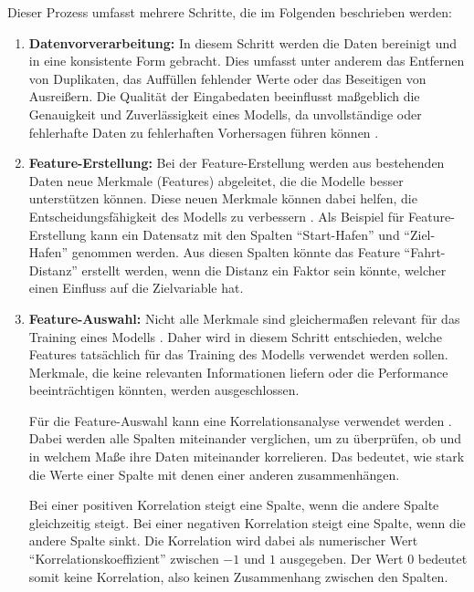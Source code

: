 Dieser Prozess umfasst mehrere Schritte, die im Folgenden beschrieben werden:

\begin{enumerate}
    \item \textbf{Datenvorverarbeitung:}  
    In diesem Schritt werden die Daten bereinigt und in eine konsistente Form gebracht. Dies umfasst unter anderem das Entfernen von Duplikaten, das Auffüllen fehlender Werte oder das Beseitigen von Ausreißern. Die Qualität der Eingabedaten beeinflusst maßgeblich die Genauigkeit und Zuverlässigkeit eines Modells, da unvollständige oder fehlerhafte Daten zu fehlerhaften Vorhersagen führen können \cite{Goodfellow2016}. 

    \item \textbf{Feature-Erstellung:}  
    Bei der Feature-Erstellung werden aus bestehenden Daten neue Merkmale (Features) abgeleitet, die die Modelle besser unterstützen können. Diese neuen Merkmale können dabei helfen, die Entscheidungsfähigkeit des Modells zu verbessern \cite{Hastie2009}. 
    Als Beispiel für Feature-Erstellung kann ein Datensatz mit den Spalten \enquote{Start-Hafen} und \enquote{Ziel-Hafen} genommen werden. Aus diesen Spalten könnte das Feature \enquote{Fahrt-Distanz} erstellt werden, wenn die Distanz ein Faktor sein könnte, welcher einen Einfluss auf die Zielvariable hat.

    
    \item \textbf{Feature-Auswahl:}  
    Nicht alle Merkmale sind gleichermaßen relevant für das Training eines Modells \cite{Goodfellow2016}. Daher wird in diesem Schritt entschieden, welche Features tatsächlich für das Training des Modells verwendet werden sollen. Merkmale, die keine relevanten Informationen liefern oder die Performance beeinträchtigen könnten, werden ausgeschlossen. 

    Für die Feature-Auswahl kann eine Korrelationsanalyse verwendet werden \cite{Guyon2003}. 
    Dabei werden alle Spalten miteinander verglichen, um zu überprüfen, ob und in welchem Maße ihre Daten miteinander korrelieren.   
    Das bedeutet, wie stark die Werte einer Spalte mit denen einer anderen zusammenhängen. 
    
    Bei einer positiven Korrelation steigt eine Spalte, wenn die andere Spalte gleichzeitig steigt. Bei einer negativen Korrelation steigt eine Spalte, wenn die andere Spalte sinkt.  
    Die Korrelation wird dabei als numerischer Wert \enquote{Korrelationskoeffizient} zwischen $-1$ und $1$ ausgegeben. Der Wert $0$ bedeutet somit keine Korrelation, also keinen Zusammenhang zwischen den Spalten. 
    

\end{enumerate}

